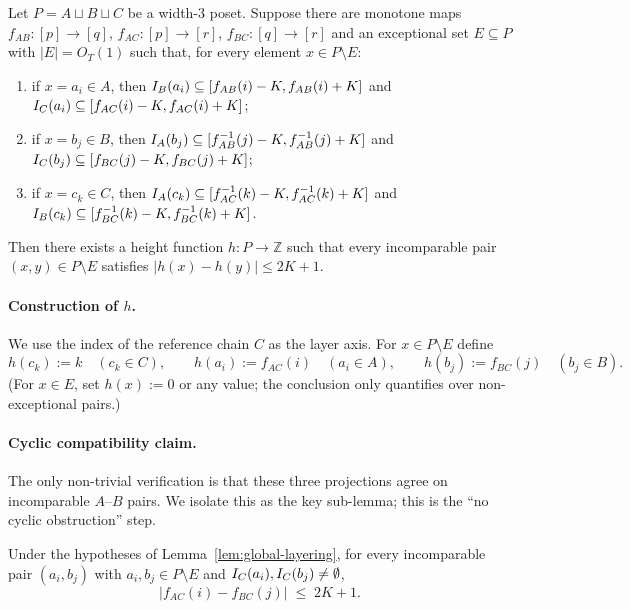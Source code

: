 \begin{lemma}\label{lem:global-layering}
Let $P = A \sqcup B \sqcup C$ be a width-$3$ poset. Suppose there are monotone
maps $f_{AB} : [p] \to [q]$, $f_{AC} : [p] \to [r]$, $f_{BC} : [q] \to [r]$
and an exceptional set $E \subseteq P$ with $|E| = O_T(1)$ such that, for
every element $x \in P \setminus E$:
\begin{enumerate}[label=(\roman*),nosep]
  \item if $x = a_i \in A$, then $I_B(a_i) \subseteq [f_{AB}(i) - K, f_{AB}(i) + K]$
    and $I_C(a_i) \subseteq [f_{AC}(i) - K, f_{AC}(i) + K]$;
  \item if $x = b_j \in B$, then $I_A(b_j) \subseteq [f_{AB}^{-1}(j) - K, f_{AB}^{-1}(j) + K]$
    and $I_C(b_j) \subseteq [f_{BC}(j) - K, f_{BC}(j) + K]$;
  \item if $x = c_k \in C$, then $I_A(c_k) \subseteq [f_{AC}^{-1}(k) - K, f_{AC}^{-1}(k) + K]$
    and $I_B(c_k) \subseteq [f_{BC}^{-1}(k) - K, f_{BC}^{-1}(k) + K]$.
\end{enumerate}
Then there exists a height function $h : P \to \mathbb{Z}$ such that every
incomparable pair $(x,y) \in P \setminus E$ satisfies
$|h(x) - h(y)| \le 2K + 1$.
\end{lemma}

\paragraph{Construction of $h$.}
We use the index of the reference chain $C$ as the layer axis. For
$x \in P \setminus E$ define
\[
h(c_k) := k \quad (c_k \in C),\qquad
h(a_i) := f_{AC}(i) \quad (a_i \in A),\qquad
h(b_j) := f_{BC}(j) \quad (b_j \in B).
\]
(For $x \in E$, set $h(x) := 0$ or any value; the conclusion only quantifies
over non-exceptional pairs.)

\paragraph{Cyclic compatibility claim.}
The only non-trivial verification is that these three projections agree on
incomparable $A$--$B$ pairs. We isolate this as the key sub-lemma; this is
the ``no cyclic obstruction'' step.

\begin{lemma}\label{lem:cyclic-compat}
Under the hypotheses of Lemma~\ref{lem:global-layering}, for every
incomparable pair $(a_i, b_j)$ with $a_i, b_j \in P \setminus E$ and
$I_C(a_i), I_C(b_j) \neq \emptyset$,
\[
|f_{AC}(i) - f_{BC}(j)| \;\le\; 2K + 1.
\]
\end{lemma}

